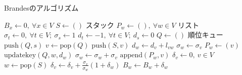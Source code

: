 \begin{algorithm}[H]
  \caption{Brandesのアルゴリズム}
  \label{algo:brandes}
  \begin{multicols}{2}
    \begin{algorithmic}[1]\small
      \State $B_x\gets 0,\:\forall x\in V$
      \State $S\gets()$ \Comment スタック
      \State $P_w\gets (),\:\forall w\in V$ \Comment リスト
      \State $\sigma_t\gets 0,\:\forall t\in V;\:\sigma_s\gets 1$
      \State $d_t\gets -1,\:\forall t\in V;\:d_s\gets 0$
      \State $Q\gets ()$ \Comment 順位キュー
      \State $\mathrm{push}(Q, s)$
      \State $v\gets\mathrm{pop}(Q)$
      \State $\mathrm{push}(S, v)$
      \State $d_w\gets d_v+l_{vw}$
      \State $\sigma_w\gets\sigma_v$
      \State $P_w\gets(v)$
      \State $\mathrm{updatekey}(Q, w, d_w)$
      \EndIf
      \State $\sigma_w\gets\sigma_w+\sigma_v$
      \State $\mathrm{append}(P_w, v)$
      \EndIf
      \EndFor
      \EndWhile
      \State $\delta_v\gets 0,\:v\in V$
      \State $w\gets\mathrm{pop}(S)$
      \State $\delta_v\gets\delta_v+\frac{\sigma_v}{\sigma_w}(1+\delta_w)$
      \EndFor
      \State $B_w\gets B_w+\delta_w$
      \EndIf
      \EndWhile
      \EndFor
      \EndProcedure
    \end{algorithmic}
  \end{multicols}
\end{algorithm}

